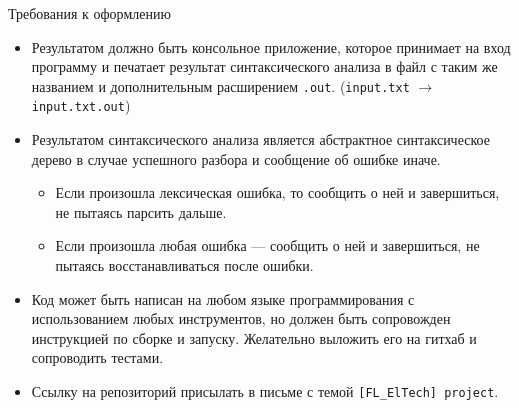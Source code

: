 \begin{center}
  {\Large Требования к оформлению}
\end{center}

      \begin{itemize}
        \item Результатом должно быть консольное приложение, которое принимает на вход программу и печатает результат синтаксического анализа в файл с таким же названием и дополнительным расширением \verb!.out!. (\verb!input.txt! $\to$ \verb!input.txt.out!)
        \item Результатом синтаксического анализа является абстрактное синтаксическое дерево в случае успешного разбора и сообщение об ошибке иначе.
        \begin{itemize}
          \item Если произошла лексическая ошибка, то сообщить о ней и завершиться, не пытаясь парсить дальше.
          \item Если произошла любая ошибка --- сообщить о ней и завершиться, не пытаясь восстанавливаться после ошибки.
        \end{itemize}
        \item Код может быть написан на любом языке программирования с использованием любых инструментов, но должен быть сопровожден инструкцией по сборке и запуску. Желательно выложить его на гитхаб и сопроводить тестами.
        \item Ссылку на репозиторий присылать в письме с темой \verb![FL_ElTech] project!.
      \end{itemize}

